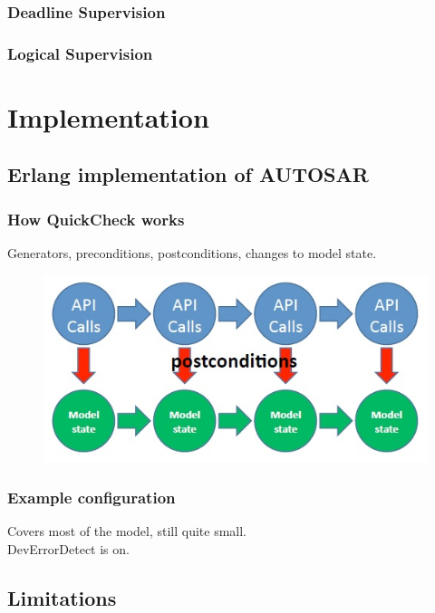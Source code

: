 \documentclass{beamer}
\begin{document}
\begin{frame}
  \frametitle{Deadline Supervision}
\end{frame}

\begin{frame}
  \frametitle{Logical Supervision}
\end{frame}
\section{Implementation}


\subsection{Erlang implementation of AUTOSAR}

\begin{frame}
  \frametitle{How QuickCheck works}
  Generators, preconditions, postconditions, changes to model state.
  \begin{figure}
    \includegraphics[keepaspectratio, width=0.7\linewidth]{api_calls}
  \end{figure}
\end{frame}

\begin{frame}
  \frametitle{Example configuration}
  Covers most of the model, still quite small.\\
  DevErrorDetect is on.\\
\end{frame}

\subsection{Limitations}
\end{document}
